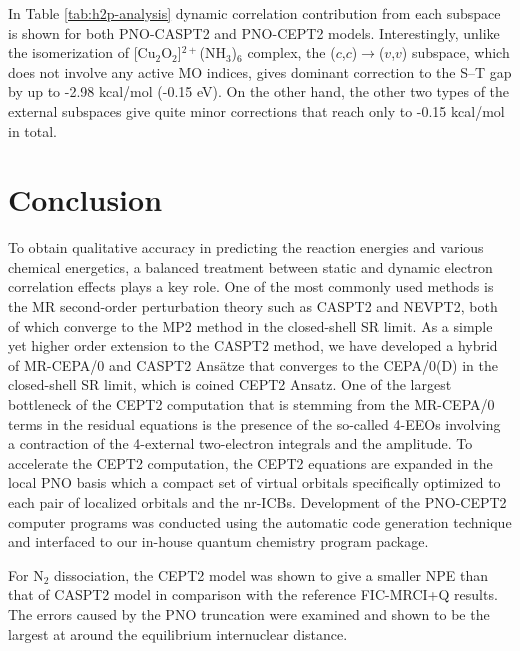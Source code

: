 \documentclass[aip,jcp,amsmath,twocolumn,floatfix,reprint,fleqn]{revtex4-1}
\begin{document}
%
In Table \ref{tab:h2p-analysis} dynamic correlation contribution from each subspace is shown for both PNO-CASPT2 and PNO-CEPT2 models.
%
Interestingly, unlike the isomerization of [Cu${}_2$O${}_2$]${}^{2+}$(NH${}_3$)${}_{6}$ complex, the ($c$,$c$)$\rightarrow$($v$,$v$) subspace, which does not involve any active MO indices, gives dominant correction to the S--T gap by up to -2.98 kcal/mol (-0.15 eV).
%
On the other hand, the other two types of the external subspaces give quite minor corrections that reach only to -0.15 kcal/mol in total.


\section{Conclusion}\label{Sec:Conclusion}

%
To obtain qualitative accuracy in predicting the reaction energies and various chemical energetics, a balanced treatment between static and dynamic electron correlation effects plays a key role.
%
One of the most commonly used methods is the MR second-order perturbation theory such as CASPT2 and NEVPT2, both of which converge to the MP2 method in the closed-shell SR limit.
%
As a simple yet higher order extension to the CASPT2 method, we have developed a hybrid of MR-CEPA/0 and CASPT2 Ans\"atze that converges to the CEPA/0(D) in the closed-shell SR limit, which is coined CEPT2 Ansatz.
%
One of the largest bottleneck of the CEPT2 computation that is stemming from the MR-CEPA/0 terms in the residual equations is the presence of the so-called 4-EEOs involving a contraction of the 4-external two-electron integrals and the amplitude.
%
To accelerate the CEPT2 computation, the CEPT2 equations are expanded in the local PNO basis which a compact set of virtual orbitals specifically optimized to each pair of localized orbitals and the nr-ICBs.
%
Development of the PNO-CEPT2 computer programs was conducted using the automatic code generation technique and interfaced to our in-house quantum chemistry program package.

%
For N${}_2$ dissociation, the CEPT2 model was shown to give a smaller NPE than that of CASPT2 model in comparison with the reference FIC-MRCI+Q results.
%
The errors caused by the PNO truncation were examined and shown to be the largest at around the equilibrium internuclear distance.
\end{document}
